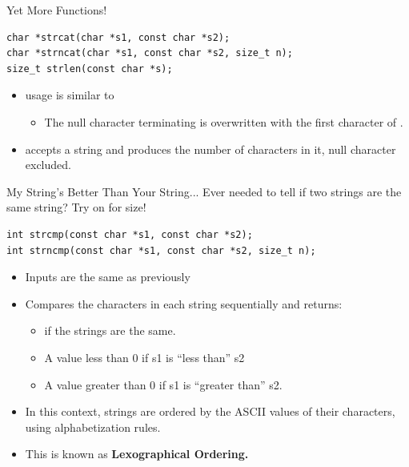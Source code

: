 \documentclass[11pt]{beamer}
\let\OldTexttt\texttt
\renewcommand{\texttt}[1]{\OldTexttt{\color{teal}{#1}}}
\begin{document}
\begin{frame}[fragile=singleslide]{Yet More Functions!}
\begin{lstlisting}[style = C]
char *strcat(char *s1, const char *s2);
char *strncat(char *s1, const char *s2, size_t n);
size_t strlen(const char *s);
\end{lstlisting}
\begin{itemize}
\item \texttt{strcat()} usage is similar to \texttt{strcpy()}
\begin{itemize}
\item The null character terminating \texttt{s1} is overwritten with the first character of \texttt{s2}.  
\end{itemize}
\item \texttt{strlen()} accepts a string and produces the number of characters in it, null character excluded.  
\end{itemize}
\end{frame}

\begin{frame}[fragile=singleslide]{My String's Better Than Your String... \texttt{strcmp}}
Ever needed to tell if two strings are the same string? Try \texttt{strcmp()} on for size! 
\begin{lstlisting}[style = C]
int strcmp(const char *s1, const char *s2);
int strncmp(const char *s1, const char *s2, size_t n);
\end{lstlisting}
\begin{itemize}
\item Inputs are the same as previously
\item Compares the characters in each string sequentially and returns:
\begin{itemize}
\item \texttt{0} if the strings are the same.
\item A value less than 0 if s1 is ``less than'' s2
\item A value greater than 0 if s1 is ``greater than'' s2.
\end{itemize}
\item In this context, strings are ordered by the ASCII values of their characters, using alphabetization rules.
\item This is known as \textbf{Lexographical Ordering.}
\end{itemize}
\end{frame}
\end{document}
